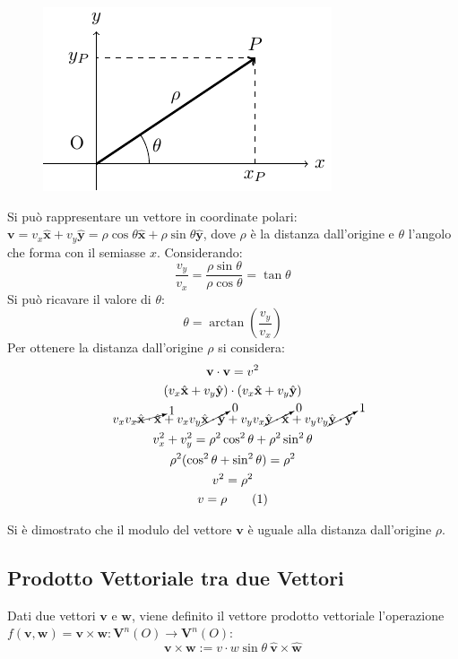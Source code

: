 \documentclass{article}
\newcommand{\vect}[1]{\boldsymbol{\mathbf{#1}}}
\numberwithin{equation}{subsection}
\begin{document}
\begin{figure}[H]%
    \centering
    \includegraphics{coordinate-polari}%
\end{figure}
Si può rappresentare un vettore in coordinate polari: $\vect{v} = v_x\hat{\vect{x}} + v_y\hat{\vect{y}} = \rho \cos\theta\hat{\vect{x}} + \rho \sin\theta\hat{\vect{y}}$, dove $\rho$ è la distanza dall'origine e $\theta$ l'angolo che forma con il semiasse $x$.
Considerando:
\begin{equation*}
    \displaystyle\frac{v_y}{v_x} = \displaystyle\frac{\rho \sin\theta}{\rho \cos\theta} = \tan\theta
\end{equation*}
Si può ricavare il valore di $\theta$: 
\begin{equation}
    \theta = \arctan\displaystyle\left(\frac{v_y}{v_x}\right)
\end{equation}
Per ottenere la distanza dall'origine $\rho$ si considera:
\begin{gather*}
    \vect{v}\cdot\vect{v} = v^{2}\\
    (v_x\hat{\vect{x}} + v_y\hat{\vect{y}})\cdot(v_x\hat{\vect{x}} + v_y\hat{\vect{y}})\\
    v_xv_x \cancelto{1}{\hat{\vect{x}}\cdot\hat{\vect{x}}} + v_xv_y\cancelto{0}{\hat{\vect{x}}\cdot\hat{\vect{y}}} + v_yv_x\cancelto{0}{\hat{\vect{y}}\cdot\hat{\vect{x}}} + v_yv_y\cancelto{1}{\hat{\vect{y}}\cdot\hat{\vect{y}}}\\
    v_x^{2} + v_y^{2} = \rho^{2}\cos^{2}\theta + \rho^2\sin^{2}\theta\\
    \rho^{2}(\cos^{2}\theta + \sin^{2}\theta) = \rho^{2}\\
    v^2=\rho^2\\
    v=\rho\tag{\stepcounter{equation}\theequation}
\end{gather*} 

Si è dimostrato che il modulo del vettore $\vect{v}$ è uguale alla distanza dall'origine $\rho$.

\subsection{Prodotto Vettoriale tra due Vettori}
Dati due vettori $\vect{v}$ e $\vect{w}$, viene definito il vettore prodotto vettoriale l'operazione $f(\vect{v},\vect{w})=\vect{v}\times\vect{w}:\vect{V}^n(O)\to \vect{V}^n(O)$: 
\begin{equation}
    \vect{v}\times\vect{w} := v\cdot w\sin\theta\:\hat{\vect{v}}\times\hat{\vect{w}}
\end{equation}
    
\end{document}
